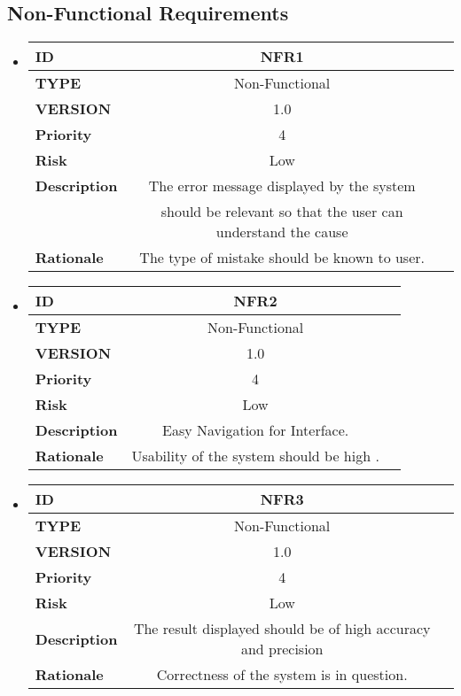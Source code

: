\documentclass[a4paper,12pt]{article}
\begin{document}
\subsection{Non-Functional Requirements}
\begin{itemize}

\item	\begin{tabular}{|| l ||c  | c||}
		\hline \hline
		\textbf{ID} & NFR1  \\ 
		\hline
		\textbf{TYPE} & Non-Functional   \\
		\hline
		\textbf{VERSION} & 1.0  \\ 
		\hline
		\textbf{Priority} & 4  \\
		\hline
		\textbf{Risk} & Low  \\ 
		\hline
		\textbf{Description} & The error message displayed by the system \\& should be relevant so that the user can understand the cause\\
		\hline
		\textbf{Rationale} & The type of mistake should be known to user.\\
		\hline
		
	\end{tabular}
	
	\item	\begin{tabular}{|| l ||c  | c||}
		\hline \hline
		\textbf{ID} & NFR2  \\ 
		\hline
		\textbf{TYPE} & Non-Functional   \\
		\hline
		\textbf{VERSION} & 1.0  \\ 
		\hline
		\textbf{Priority} & 4  \\
		\hline
		\textbf{Risk} & Low  \\ 
		\hline
		\textbf{Description} & Easy Navigation for Interface.\\
		\hline
		\textbf{Rationale} & Usability of the system should be high .\\
		\hline
		
	\end{tabular}

\newpage

	\item	\begin{tabular}{|| l ||c  | c||}
		\hline \hline
		\textbf{ID} & NFR3  \\ 
		\hline
		\textbf{TYPE} & Non-Functional   \\
		\hline
		\textbf{VERSION} & 1.0  \\ 
		\hline
		\textbf{Priority} & 4  \\
		\hline
		\textbf{Risk} & Low  \\ 
		\hline
		\textbf{Description} & The result displayed should be of high accuracy and precision\\
		\hline
		\textbf{Rationale} & Correctness of the system is in question.\\
		\hline
		
	\end{tabular}
	
	
	
	
\end{itemize}
\end{document}

